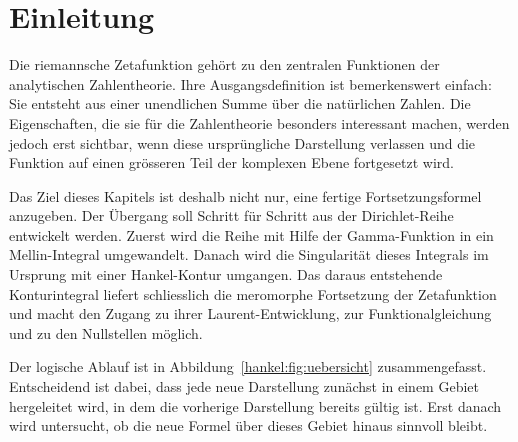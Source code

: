 %
%
%
%

\section{Einleitung
\label{hankel:section:einleitung}}

Die riemannsche Zetafunktion gehört zu den zentralen Funktionen der
analytischen Zahlentheorie. 
%
%
%
Ihre Ausgangsdefinition ist bemerkenswert einfach:
Sie entsteht aus einer unendlichen Summe über die natürlichen Zahlen. 
Die Eigenschaften, die sie für die Zahlentheorie besonders interessant machen, werden jedoch erst sichtbar, wenn diese ursprüngliche Darstellung verlassen
und die Funktion auf einen grösseren Teil der komplexen Ebene fortgesetzt wird.

Das Ziel dieses Kapitels ist deshalb nicht nur, eine fertige
Fortsetzungsformel anzugeben. 
Der Übergang soll Schritt für Schritt aus der Dirichlet-Reihe entwickelt werden. 
%
Zuerst wird die Reihe mit Hilfe der Gamma-Funktion in ein Mellin-Integral umgewandelt. 
%
Danach wird die Singularität dieses Integrals im Ursprung mit einer Hankel-Kontur umgangen. 
%
Das daraus entstehende Konturintegral liefert schliesslich die meromorphe Fortsetzung der Zetafunktion und macht den Zugang zu ihrer Laurent-Entwicklung, zur Funktionalgleichung und zu den Nullstellen möglich.
%
%

Der logische Ablauf ist in Abbildung~\ref{hankel:fig:uebersicht}
zusammengefasst. 
Entscheidend ist dabei, dass jede neue Darstellung zunächst
in einem Gebiet hergeleitet wird, in dem die vorherige Darstellung bereits gültig ist. 
Erst danach wird untersucht, ob die neue Formel über dieses Gebiet hinaus sinnvoll bleibt.

